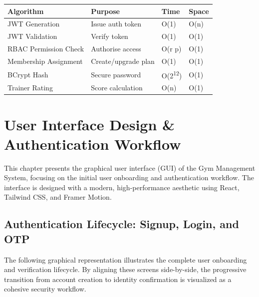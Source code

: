 \documentclass[
  12pt,
  a4paperpaper,
]{report}
\begin{document}
{
\renewcommand{\arraystretch}{1.5}
\begin{longtable}[]{@{} p{} p{} p{} p{} @{}}
\hline
\textbf{Algorithm} & \textbf{Purpose} & \textbf{Time} & \textbf{Space} \\
\hline
\endhead
\hline
\endlastfoot
JWT Generation & Issue auth token & O(1) & O(n) \\
JWT Validation & Verify token & O(1) & O(1) \\
RBAC Permission Check & Authorise access & O(r \texttimes{} p) & O(1) \\
Membership Assignment & Create/upgrade plan & O(1) & O(1) \\
BCrypt Hash & Secure password & O(2\textsuperscript{12}) & O(1) \\
Trainer Rating & Score calculation & O(n) & O(1) \\
\end{longtable}
}





\chapter{User Interface Design \& Authentication Workflow}\label{ch-ui-design}

\noindent
This chapter presents the graphical user interface (GUI) of the Gym Management System, focusing on the initial user onboarding and authentication workflow. The interface is designed with a modern, high-performance aesthetic using React, Tailwind CSS, and Framer Motion.

\vspace{0.8cm}

\section{Authentication Lifecycle: Signup, Login, and OTP}\label{sec-auth-lifecycle}

\noindent
The following graphical representation illustrates the complete user onboarding and verification lifecycle. By aligning these screens side-by-side, the progressive transition from account creation to identity confirmation is visualized as a cohesive security workflow.

\vspace{0.8cm}
\end{document}
